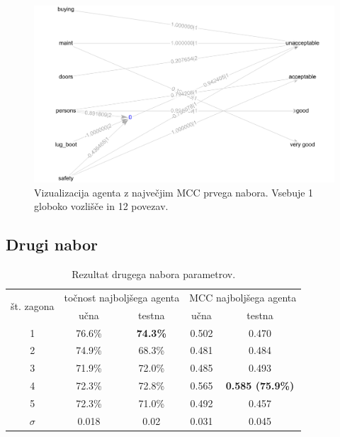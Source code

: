 \begin{figure}[H]
    \begin{center}
        \includegraphics[width=13cm]{car/1/mcc_g}
    \end{center}
    \caption{Vizualizacija agenta z največjim MCC prvega nabora. Vsebuje 1 globoko vozlišče in 12 povezav.}
    \label{fig:car_mcc_1_g}
\end{figure}

\subsection{Drugi nabor}\label{subsec:dodatek-car-drugi-nabor}
\begin{table}[H]
    \begin{center}
        \begin{tabular}{|| c | c c || c c ||}
            \hline
            \multirow{2}{*}{št. zagona} & \multicolumn{2}{c||}{točnost najboljšega agenta} & \multicolumn{2}{c||}{MCC najboljšega agenta} \\ \cline{2-5}
            & učna   & testna          & učna  & testna                  \\
            \hline
            1        & 76.6\% & \textbf{74.3\%} & 0.502 & 0.470                   \\
            \hline
            2        & 74.9\% & 68.3\%          & 0.481 & 0.484                   \\
            \hline
            3        & 71.9\% & 72.0\%          & 0.485 & 0.493                   \\
            \hline
            4        & 72.3\% & 72.8\%          & 0.565 & \textbf{0.585 (75.9\%)} \\
            \hline
            5        & 72.3\% & 71.0\%          & 0.492 & 0.457                   \\
            \hline
            $\sigma$ & 0.018  & 0.02            & 0.031 & 0.045                   \\
            \hline
        \end{tabular}
    \end{center}
    \caption{Rezultat drugega nabora parametrov.}
    \label{tab:car_result_2}
\end{table}

